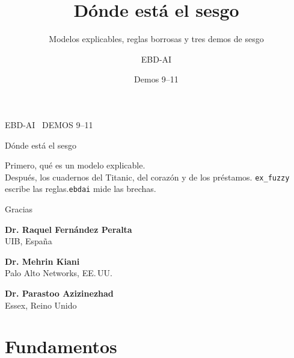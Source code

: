\documentclass[aspectratio=169,11pt]{beamer}
\title{Dónde está el sesgo}
\subtitle{Modelos explicables, reglas borrosas y tres demos de sesgo}
\author{EBD-AI}
\date{Demos 9--11}
\institute{}
\begin{document}

\begin{frame}
  \vspace{0.6em}
  {\color{ebdgreen}\scriptsize EBD-AI \textperiodcentered\ DEMOS 9--11}
  \par\vspace{0.7em}
  {\Huge Dónde está el sesgo\par}
  \vspace{0.7em}
  {\large Primero, qué es un modelo explicable.\\[0.25em]
  Después, los cuadernos del Titanic, del corazón y de los préstamos.}
  \vfill
  {\color{ebdmuted}\small\texttt{ex\_fuzzy} escribe las reglas.\quad\texttt{ebdai} mide las brechas.}
\end{frame}


\begin{frame}
  \vspace{0.35em}
  {Gracias\par}
  \vspace{0.15em}
  {\large
  \textbf{Dr. Raquel Fernández Peralta}\\[0.2em]
  {\normalsize\color{ebdmuted}UIB, España}

  \vspace{0.85em}
  \textbf{Dr. Mehrin Kiani}\\[0.2em]
  {\normalsize\color{ebdmuted}Palo Alto Networks, EE.\,UU.}

  \vspace{0.85em}
  \textbf{Dr. Parastoo Azizinezhad}\\[0.2em]
  {\normalsize\color{ebdmuted}Essex, Reino Unido}}
\end{frame}

\section{Fundamentos}
\end{document}
